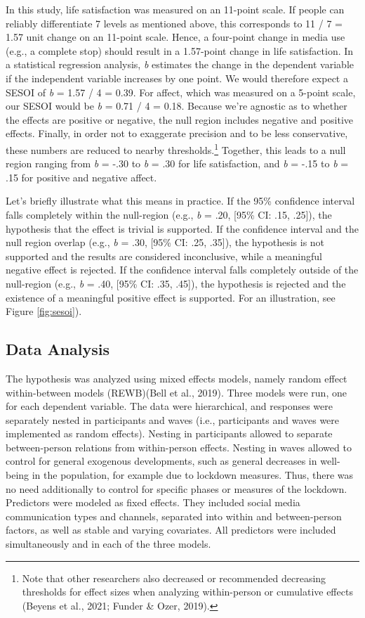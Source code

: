 \documentclass[
  man,mask]{apa6}
\begin{document}
In this study, life satisfaction was measured on an 11-point scale.
If people can reliably differentiate 7 levels as mentioned above, this corresponds to 11 / 7 = 1.57 unit change on an 11-point scale.
Hence, a four-point change in media use (e.g., a complete stop) should result in a 1.57-point change in life satisfaction.
In a statistical regression analysis, \emph{b} estimates the change in the dependent variable if the independent variable increases by one point.
We would therefore expect a SESOI of \emph{b} = 1.57 / 4 = 0.39.
For affect, which was measured on a 5-point scale, our SESOI would be \emph{b} = 0.71 / 4 = 0.18.
Because we're agnostic as to whether the effects are positive or negative, the null region includes negative and positive effects.
Finally, in order not to exaggerate precision and to be less conservative, these numbers are reduced to nearby thresholds.\footnote{Note that other researchers also decreased or recommended decreasing thresholds for effect sizes when analyzing within-person or cumulative effects (Beyens et al., 2021; Funder \& Ozer, 2019).}
Together, this leads to a null region ranging from \emph{b} = -.30 to \emph{b} = .30 for life satisfaction, and \emph{b} = -.15 to \emph{b} = .15 for positive and negative affect.

Let's briefly illustrate what this means in practice.
If the 95\% confidence interval falls completely within the null-region (e.g., \emph{b} = .20, {[}95\% CI: .15, .25{]}), the hypothesis that the effect is trivial is supported.
If the confidence interval and the null region overlap (e.g., \emph{b} = .30, {[}95\% CI: .25, .35{]}), the hypothesis is not supported and the results are considered inconclusive, while a meaningful negative effect is rejected.
If the confidence interval falls completely outside of the null-region (e.g., \emph{b} = .40, {[}95\% CI: .35, .45{]}), the hypothesis is rejected and the existence of a meaningful positive effect is supported.
For an illustration, see Figure \ref{fig:sesoi}).

\hypertarget{data-analysis}{%
\subsection{Data Analysis}\label{data-analysis}}

The hypothesis was analyzed using mixed effects models, namely random effect within-between models (REWB)(Bell et al., 2019).
Three models were run, one for each dependent variable.
The data were hierarchical, and responses were separately nested in participants and waves (i.e., participants and waves were implemented as random effects).
Nesting in participants allowed to separate between-person relations from within-person effects.
Nesting in waves allowed to control for general exogenous developments, such as general decreases in well-being in the population, for example due to lockdown measures.
Thus, there was no need additionally to control for specific phases or measures of the lockdown.
Predictors were modeled as fixed effects.
They included social media communication types and channels, separated into within and between-person factors, as well as stable and varying covariates.
All predictors were included simultaneously and in each of the three models.
\end{document}
